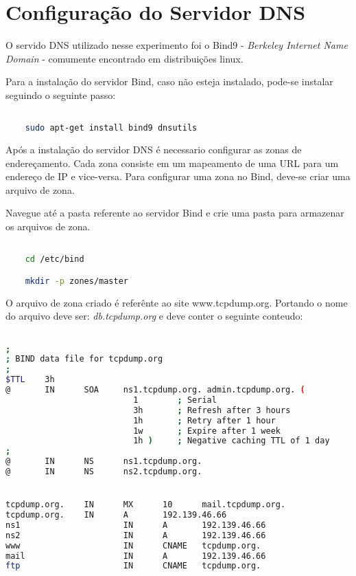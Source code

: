 \documentclass[12pt,openright,a4paper]{report}
\begin{document}
\section{Configuração do Servidor DNS}
\label{sec_configuracao}

O servido DNS utilizado nesse experimento foi o Bind9 - \textit{Berkeley Internet Name Domain} - comumente encontrado em distribuições linux.

Para a instalação do servidor Bind, caso não esteja instalado, pode-se instalar seguindo o seguinte passo:

\begin{lstlisting}[language=bash]

	sudo apt-get install bind9 dnsutils

\end{lstlisting}

Após a instalação do servidor DNS é necessario configurar as zonas de endereçamento. Cada zona consiste em um mapeamento de uma URL para um endereço de IP e vice-versa. Para configurar uma zona no Bind, deve-se criar uma arquivo de zona.

Navegue até a pasta referente ao servidor Bind e crie uma pasta para armazenar os arquivos de zona.

\begin{lstlisting}[language=bash]

	cd /etc/bind

	mkdir -p zones/master

\end{lstlisting}

O arquivo de zona criado é referênte ao site www.tcpdump.org. Portando o nome do arquivo deve ser: \textit{db.tcpdump.org} e deve conter o seguinte conteudo:

\begin{lstlisting}[language=bash]

;
; BIND data file for tcpdump.org
;
$TTL    3h
@       IN      SOA     ns1.tcpdump.org. admin.tcpdump.org. (
                          1        ; Serial
                          3h       ; Refresh after 3 hours
                          1h       ; Retry after 1 hour
                          1w       ; Expire after 1 week
                          1h )     ; Negative caching TTL of 1 day
;
@       IN      NS      ns1.tcpdump.org.
@       IN      NS      ns2.tcpdump.org.


tcpdump.org.    IN      MX      10      mail.tcpdump.org.
tcpdump.org.    IN      A       192.139.46.66
ns1                     IN      A       192.139.46.66
ns2                     IN      A       192.139.46.66
www                     IN      CNAME   tcpdump.org.
mail                    IN      A       192.139.46.66
ftp                     IN      CNAME   tcpdump.org.

\end{lstlisting}
\end{document}
